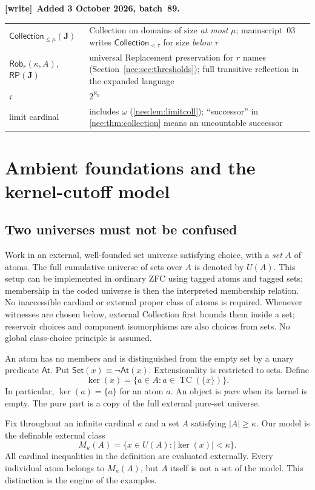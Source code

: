 \documentclass[11pt,letterpaper]{article}
\numberwithin{equation}{section}
\theoremstyle{plain}
\theoremstyle{definition}
\theoremstyle{remark}
\newcommand{\At}{\mathsf{At}}
\newcommand{\Set}{\mathsf{Set}}
\newcommand{\Coll}{\mathsf{Collection}}
\newcommand{\RP}{\mathsf{RP}}
\newcommand{\kerat}{\operatorname{ker}}
\newcommand{\TC}{\operatorname{TC}}
\newcommand{\cont}{\mathfrak c}
\newenvironment{writenote}[1][]{\par\smallskip\begingroup\small\raggedright
 \setlength{\parindent}{1.25em}\noindent\textbf{[write]}\if\relax\detokenize{#1}\relax\else~\textbf{#1.}\fi\ }%
 {\par\endgroup\smallskip}
\begin{document}
\begin{writenote}[Added 3 October 2026, batch~89]
\begin{center}
\begin{tabular}{>{\raggedright\arraybackslash}p{}>{\raggedright\arraybackslash}p{}}
$\Coll_{\leq\mu}(\boldsymbol J)$ & Collection on domains of size \emph{at most} $\mu$; manuscript~03 writes $\Coll_{<\tau}$ for size \emph{below} $\tau$\\
$\mathsf{Rob}_r(\kappa,A)$, $\RP(\boldsymbol J)$ & universal Replacement preservation for $r$ names (Section~\ref{nee:sec:thresholds}); full transitive reflection in the expanded language\\
$\cont$ & $2^{\aleph_0}$\\
limit cardinal & includes $\omega$ (\cref{nee:lem:limitcoll}); ``successor'' in \cref{nee:thm:collection} means an uncountable successor\\
\bottomrule
\end{tabular}
\end{center}
\end{writenote}

\section{Ambient foundations and the kernel-cutoff model}\label{nee:sec:model}

\subsection{Two universes must not be confused}
Work in an external, well-founded set universe satisfying choice, with a \emph{set} $A$ of atoms. The full cumulative universe of sets over $A$ is denoted by $U(A)$. This setup can be implemented in ordinary ZFC using tagged atoms and tagged sets; membership in the coded universe is then the interpreted membership relation. No inaccessible cardinal or external proper class of atoms is required. Whenever witnesses are chosen below, external Collection first bounds them inside a set; reservoir choices and component isomorphisms are also choices from sets. No global class-choice principle is assumed.

An atom has no members and is distinguished from the empty set by a unary predicate $\At$. Put $\Set(x)\equiv\neg\At(x)$. Extensionality is restricted to sets. Define
\[
\kerat(x)=\{a\in A:a\in\TC(\{x\})\}.
\]
In particular, $\kerat(a)=\{a\}$ for an atom $a$. An object is \emph{pure} when its kernel is empty. The pure part is a copy of the full external pure-set universe.

Fix throughout an infinite cardinal $\kappa$ and a set $A$ satisfying $|A|\geq\kappa$. Our model is the definable external class
\begin{equation}\label{nee:eq:model}
M_\kappa(A)=\{x\in U(A):|\kerat(x)|<\kappa\}.
\end{equation}
All cardinal inequalities in the definition are evaluated externally. Every individual atom belongs to $M_\kappa(A)$, but $A$ itself is not a set of the model. This distinction is the engine of the examples.
\end{document}
